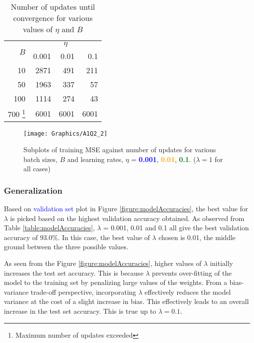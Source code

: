\documentclass[a4paper,12pt]{article}
\begin{document}
\begin{table}[ht]
	\centering %
    \caption{Number of updates until convergence for various values of 
    	$\eta$ and $B$} %
	\label{table:etaBatchSizeAndNumUpdates} %
    \vspace{1em}
	\begin{tabular}{r|r r r}
		\toprule
		\multirow{2}{*}{$B$} & \multicolumn{3}{c}{$\eta$} \\
        & 0.001 & 0.01 & 0.1 \\
        \hline
        10 & 2871 & 491 & 211 \\
        50 & 1963 & 337 & 57 \\
        100 & 1114 & 274 & 43 \\
        700 \footnote{Maximum number of updates exceeded} & 6001 & 6001 & 6001 \\
        [1ex] %
		\hline
	\end{tabular}
\end{table}
\clearpage
\begin{figure}[!htb]
	\centering
	\texttt{[image: Graphics/A1Q2\_2]}
    \caption{\label{figure:BatchSubplots}Subplots of training MSE against 
    	number of updates for various batch sizes, $B$ and learning rates,
        $\eta$ = \textcolor{blue}{\textbf{0.001}}, \textcolor{orange}
        {\textbf{0.01}}, \textcolor{green}{\textbf{0.1}}. ($\lambda = 1$ for all cases)}
\end{figure}
\clearpage
\subsubsection{Generalization}

Based on \textcolor{blue}{validation set} plot in Figure \ref{figure:modelAccuracies}, the best value for $\lambda$ is picked based on the highest validation accuracy obtained. As observed from Table \ref{table:modelAccuracies}, $\lambda$ = 0.001, 0.01 and 0.1 all give the best validation accuracy of 93.0\%. In this case, the best value of $\lambda$ chosen is 0.01, the middle ground between the three possible values.

As seen from the Figure \ref{figure:modelAccuracies}, higher values of $\lambda$ initially increases the test set accuracy. This is because $\lambda$ prevents over-fitting of the model to the training set by penalizing large values of the weights. From a bias-variance trade-off perspective, incorporating $\lambda$ effectively reduces the model variance at the cost of a slight increase in bias. This effectively leads to an overall increase in the test set accuracy. This is true up to $\lambda = 0.1$.
\end{document}
